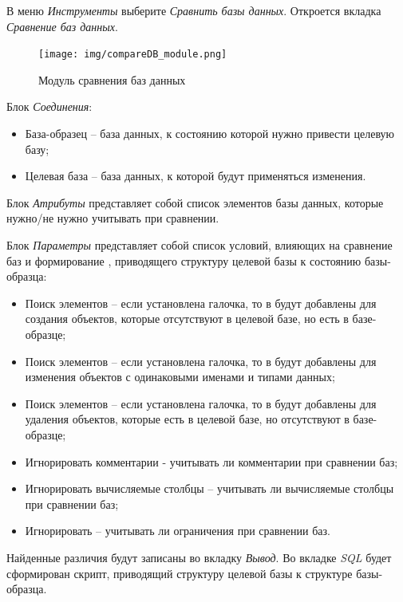 В меню \textit{Инструменты} выберите \textit{Сравнить базы данных}. Откроется вкладка \textit{Сравнение баз данных}.

\begin{figure}[H]
	\centering
	\texttt{[image: img/compareDB\_module.png]}
	\caption{Модуль сравнения баз данных}
\end{figure}

Блок \textit{Соединения}:
\begin{itemize}
	\item База-образец -- база данных, к состоянию которой нужно привести целевую базу;
	\item Целевая база -- база данных, к которой будут применяться изменения.
\end{itemize}	

Блок \textit{Атрибуты} представляет собой список элементов базы данных, которые нужно/не нужно учитывать при сравнении.

Блок \textit{Параметры} представляет собой список условий, влияющих на сравнение баз и формирование , приводящего структуру целевой базы к состоянию базы-образца:
\begin{itemize}
	\item Поиск  элементов -- если установлена галочка, то в  будут добавлены  для создания объектов, которые отсутствуют в целевой базе, но есть в базе-образце;
	\item Поиск  элементов -- если установлена галочка, то в  будут добавлены  для изменения объектов с одинаковыми именами и типами данных;
	\item Поиск  элементов -- если установлена галочка, то в  будут добавлены  для удаления объектов, которые есть в целевой базе, но отсутствуют в базе-образце;
	\item Игнорировать комментарии - учитывать ли комментарии при сравнении баз;
	\item Игнорировать вычисляемые столбцы -- учитывать ли вычисляемые столбцы при сравнении баз; 
	\item Игнорировать  -- учитывать ли ограничения при сравнении баз.
\end{itemize}

Найденные различия будут записаны во вкладку \textit{Вывод}. Во вкладке \textit{SQL} будет сформирован скрипт, приводящий структуру целевой базы к структуре базы-образца.

